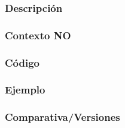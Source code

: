 \subsubsection{Descripci\'on} 
\subsubsection{Contexto NO} 
\subsubsection{C\'odigo} 

\subsubsection{Ejemplo} 
\subsubsection{Comparativa/Versiones} 